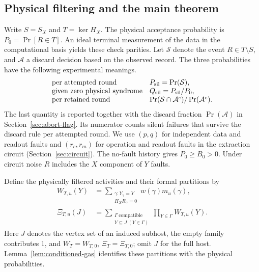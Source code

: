 \documentclass[10pt,twocolumn]{article}
\theoremstyle{definition}
\begin{document}
\subsection{Physical filtering and the main theorem}
Write $S=S_X$ and $T=\ker H_X$. The physical acceptance probability
is $P_0=\Pr[R\in T]$. An ideal terminal measurement of the data in the
computational basis yields these check parities. Let $\mathcal S$ denote
the event $R\in T\setminus S$, and $\mathcal A$ a discard decision
based on the observed record. The three probabilities have the following
experimental meanings.
\[
\begin{array}{ll}
\text{per attempted round}      & P_{\rm sil}=\Pr(\mathcal S),\\
\text{given zero physical syndrome} & Q_{\rm sil}=P_{\rm sil}/P_0,\\
  \text{per retained round}       & \Pr(\mathcal S\cap\mathcal A^c)/\Pr(\mathcal A^c).
\end{array}
\]
The last quantity is reported together with the discard fraction
$\Pr(\mathcal A)$ in Section~\ref{sec:abort-flag}. Its numerator
counts silent failures that survive the discard rule per attempted
round. We use $(p,q)$ for independent data and readout faults and
$(r_c,r_m)$ for operation and readout faults in the extraction circuit
(Section~\ref{sec:circuit}). The no-fault
history gives $P_0\ge B_0>0$. Under circuit noise $R$ includes the
$X$ component of $Y$ faults.

Define the physically filtered activities and their formal partitions by
\begin{equation}\label{eq:filtered-weights-definition}
\begin{split}
 W_{T,u}(Y)&=\sum_{\substack{\gamma:Y_\gamma=Y\\H_XR_\gamma=0}}
                  w(\gamma)m_u(\gamma),\\
 \Xi_{T,u}(J)&=\sum_{\substack{\Gamma\ \mathrm{compatible}\\Y\subseteq J\ (Y\in\Gamma)}}
                        \prod_{Y\in\Gamma}W_{T,u}(Y).
\end{split}
\end{equation}
Here $J$ denotes the vertex set of an induced subhost, the empty family
contributes $1$, and $W_T=W_{T,0}$, $\Xi_T=\Xi_{T,0}$; omit $J$ for
the full host. Lemma~\ref{lem:conditioned-gas} identifies these partitions
with the physical probabilities.
\end{document}
